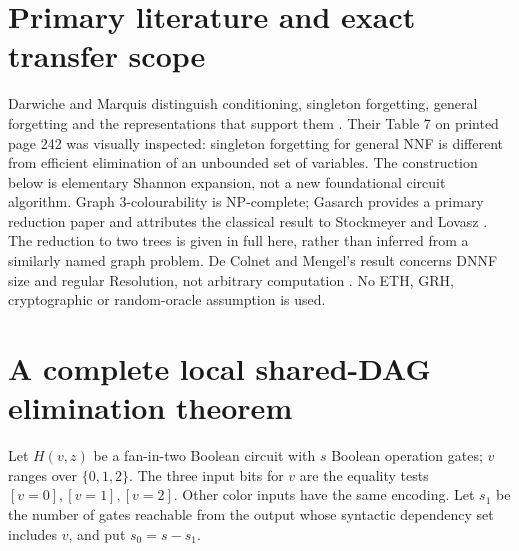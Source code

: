 \documentclass[11pt]{article}
\newcommand{\Col}{\{0,1,2\}}
\begin{document}
\section{Primary literature and exact transfer scope}
Darwiche and Marquis distinguish conditioning, singleton forgetting, general
forgetting and the representations that support them \cite{dm}. Their
Table 7 on printed page 242 was visually inspected: singleton forgetting for
general NNF is different from efficient elimination of an unbounded set of
variables. The construction below is elementary Shannon expansion, not a
new foundational circuit algorithm. Graph 3-colourability is NP-complete;
Gasarch provides a primary reduction paper and attributes the classical
result to Stockmeyer and Lovasz \cite{gasarch}. The reduction to two trees is
given in full here, rather than inferred from a similarly named graph problem.
De Colnet and Mengel's result concerns DNNF size and regular Resolution,
not arbitrary computation \cite{colnet}. No ETH, GRH, cryptographic or
random-oracle assumption is used.

\section{A complete local shared-DAG elimination theorem}
Let $H(v,z)$ be a fan-in-two Boolean circuit with $s$ Boolean operation gates;
$v$ ranges over $\Col$. The three input bits for $v$ are the equality tests
$[v=0],[v=1],[v=2]$. Other color inputs have the same encoding. Let $s_1$
be the number of gates reachable from the output whose syntactic dependency
set includes $v$, and put $s_0=s-s_1$.
\end{document}
